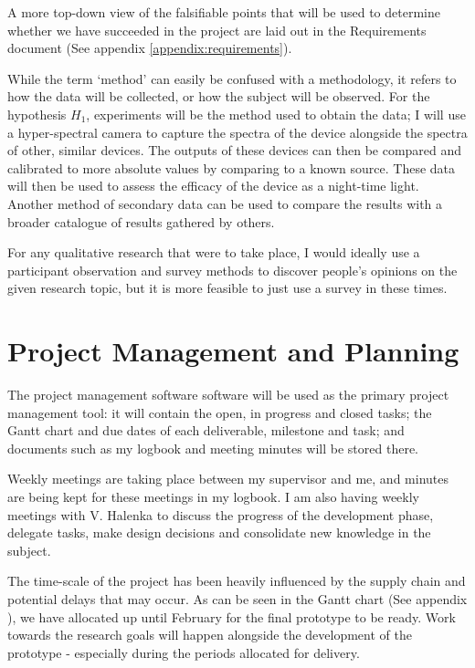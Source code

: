 \documentclass[twoside,twocolumn]{article}
\begin{document}
A more top-down view of the falsifiable points that will be used to determine whether we have succeeded in the project are laid out in the Requirements document (See appendix \ref{appendix:requirements}).

While the term `method' can easily be confused with a methodology, it refers to how the data will be collected, or how the subject will be observed. For the hypothesis $H_{1}$, experiments will be the method used to obtain the data; I will use a hyper-spectral camera to capture the spectra of the device alongside the spectra of other, similar devices. The outputs of these devices can then be compared and calibrated to more absolute values by comparing to a known source. These data will then be used to assess the efficacy of the device as a night-time light. Another method of secondary data can be used to compare the results with a broader catalogue of results gathered by others. 

For any qualitative research that were to take place, I would ideally use a participant observation and survey methods to discover people's opinions on the given research topic, but it is more feasible to just use a survey in these times.


\section{Project Management and Planning}
\label{sec:planning}

The project management software \cite{ClickUpProjectManagement2020} software will be used as the primary project management tool: it will contain the open, in progress and closed tasks; the Gantt chart and due dates of each deliverable, milestone and task; and documents such as my logbook and meeting minutes will be stored there.

Weekly meetings are taking place between my supervisor and me, and minutes are being kept for these meetings in my logbook. I am also having weekly meetings with V. Halenka to discuss the progress of the development phase, delegate tasks, make design decisions and consolidate new knowledge in the subject. 

The time-scale of the project has been heavily influenced by the supply chain and potential delays that may occur. As can be seen in the Gantt chart (See appendix ), we have allocated up until February for the final prototype to be ready. Work towards the research goals will happen alongside the development of the prototype - especially during the periods allocated for delivery.
\end{document}
